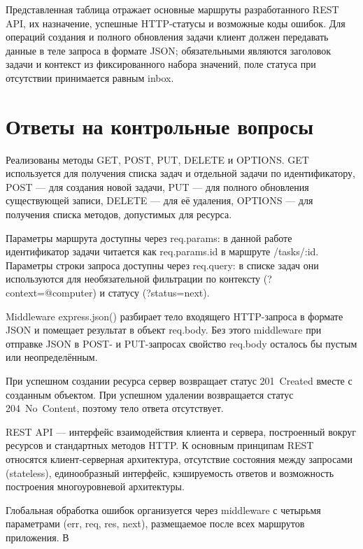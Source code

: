 \documentclass{stp}
\begin{document}
Представленная таблица отражает основные маршруты разработанного
REST API, их назначение, успешные HTTP-статусы и возможные коды
ошибок. Для операций создания и полного обновления задачи клиент
должен передавать данные в теле запроса в формате JSON; обязательными
являются заголовок задачи и контекст из фиксированного набора
значений, поле статуса при отсутствии принимается равным
inbox.

\section{Ответы на контрольные вопросы}

\begin{stpnum}
  \item Реализованы методы GET, POST, PUT, DELETE и OPTIONS. GET
    используется для получения списка задач и отдельной задачи по
    идентификатору, POST — для создания новой задачи, PUT — для
    полного обновления существующей записи, DELETE — для её
    удаления, OPTIONS — для получения списка методов, допустимых для
    ресурса.
  \item Параметры маршрута доступны через req.params: в
    данной работе идентификатор задачи читается как
    req.params.id в маршруте /tasks/:id. Параметры
    строки запроса доступны через req.query: в списке задач
    они используются для необязательной фильтрации по контексту
    (?context=@computer) и статусу (?status=next).
  \item Middleware express.json() разбирает тело входящего
    HTTP-запроса в формате JSON и помещает результат в объект
    req.body. Без этого middleware при отправке JSON в
    POST- и PUT-запросах свойство req.body осталось бы
    пустым или неопределённым.
  \item При успешном создании ресурса сервер возвращает статус
    201~Created вместе с созданным объектом. При успешном удалении
    возвращается статус 204~No~Content, поэтому тело ответа
    отсутствует.
  \item REST API — интерфейс взаимодействия клиента и сервера,
    построенный вокруг ресурсов и стандартных методов HTTP. К
    основным принципам REST относятся клиент-серверная архитектура,
    отсутствие состояния между запросами (stateless), единообразный
    интерфейс, кэшируемость ответов и возможность построения
    многоуровневой архитектуры.
  \item Глобальная обработка ошибок организуется через middleware с
    четырьмя параметрами (err, req, res,
    next), размещаемое после всех маршрутов приложения. В

\end{stpnum}
\end{document}
